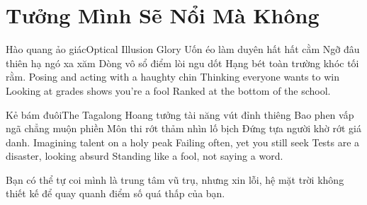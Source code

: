 \chapter{Tưởng Mình Sẽ Nổi Mà Không}

\begin{tutuyetbox}{Hào quang ảo giác}{Optical Illusion Glory}
Uốn éo làm duyên hất hất cằm
Ngỡ đâu thiên hạ ngó xa xăm
Dòng vô sổ điểm lòi ngu dốt
Hạng bét toàn trường khóc tối rằm.
\tcblower
Posing and acting with a haughty chin 
Thinking everyone wants to win 
Looking at grades shows you're a fool 
Ranked at the bottom of the school.
\end{tutuyetbox}

\begin{tutuyetbox}{Kẻ bám đuôi}{The Tagalong}
Hoang tưởng tài năng vút đỉnh thiêng
Bao phen vấp ngã chẳng muộn phiền
Môn thi rớt thảm nhìn lố bịch
Đứng tựa người khờ rớt giá danh.
\tcblower
Imagining talent on a holy peak 
Failing often, yet you still seek 
Tests are a disaster, looking absurd 
Standing like a fool, not saying a word.
\end{tutuyetbox}

\begin{ghichu}
Bạn có thể tự coi mình là trung tâm vũ trụ, nhưng xin lỗi, hệ mặt trời không thiết kế để quay quanh điểm số quá thấp của bạn.
\end{ghichu}